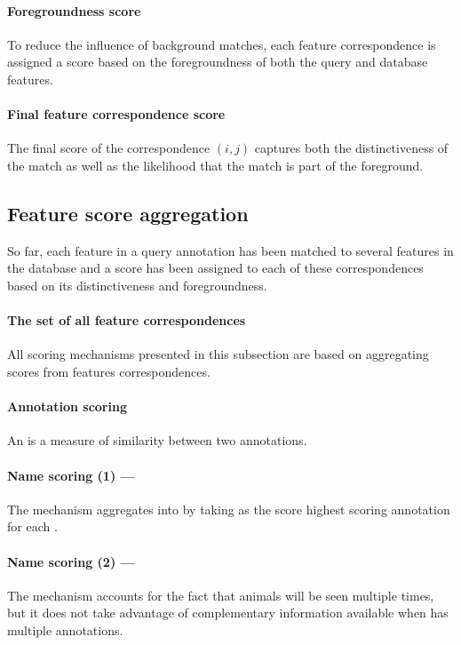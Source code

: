         \paragraph{Foregroundness score}
        To reduce the influence of background matches, each feature correspondence is assigned a score based on the
          foregroundness of both the query and database features.
        
        \paragraph{Final feature correspondence score}
        The final score of the correspondence $(i, j)$ captures both the distinctiveness of the match as well as the
          likelihood that the match is part of the foreground.
        
    \subsection{Feature score aggregation}
        So far, each feature in a query annotation has been matched to several features in the database and a score
          has been assigned to each of these correspondences based on its distinctiveness and foregroundness.
        
        \paragraph{The set of all feature correspondences}
        All scoring mechanisms presented in this subsection are based on aggregating scores from features
          correspondences.
        
        \paragraph{Annotation scoring}
        An \annotscore{} is a measure of similarity between two annotations.
        \paragraph{Name scoring (1) --- \csumprefix{}} %
        The \cscoring{} mechanism aggregates \annotscores{} into \namescores{} by taking as the score highest scoring
          annotation for each \name{}.
        
        \paragraph{Name scoring (2) --- \nsumprefix{}} %
        The \cscoring{} mechanism accounts for the fact that animals will be seen multiple times, but it does not take
          advantage of complementary information available when \aan{\name{}} has multiple annotations.
        

